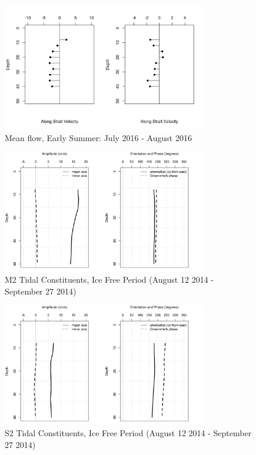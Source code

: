 \documentclass[12pt]{dforeport}
\begin{document}
\begin{figure}  
\centering
\includegraphics[width = 0.8\textwidth]{./figures/47_smf_earlySummer_2016.png}
\caption[Mean flow, Early Summer, 2016]{Mean flow, Early Summer: July 2016 - August 2016}
\label{f:smf_es_2016}
\end{figure}



\begin{figure}  
\centering
\includegraphics[width = 0.8\textwidth]{./figures/48_M2TC_if_2014.png}
\caption[M2 Tidal Constituents, Ice free, 2014]{M2 Tidal Constituents, Ice Free Period (August 12 2014 - September 27 2014)}
\label{f:m2_if_2014}
\end{figure}

\begin{figure}  
\centering
\includegraphics[width = 0.8\textwidth]{./figures/49_S2TC_if_2014.png}
\caption[S2 Tidal Constituents, Ice free, 2014]{S2 Tidal Constituents, Ice Free Period (August 12 2014 - September 27 2014)}
\label{f:s2_if_2014}
\end{figure}
\end{document}
